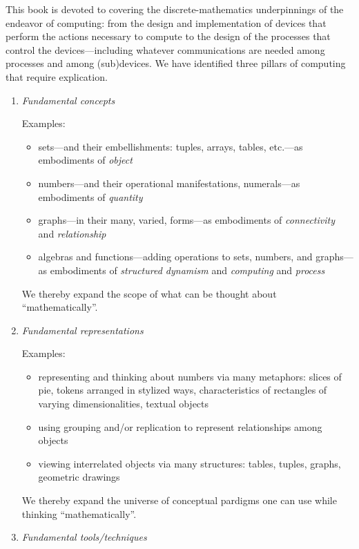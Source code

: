 This book is devoted to covering the discrete-mathematics
underpinnings of the endeavor of computing: from the design and
implementation of devices that perform the actions necessary to
compute to the design of the processes that control the
devices---including whatever communications are needed among processes
and among (sub)devices.  We have identified three pillars of computing
that require explication.
\begin{enumerate}
\item
{\it Fundamental concepts}

\medskip

{\small\sf Examples:}
\begin{itemize}
\item%
sets---and their embellishments: tuples, arrays, tables, etc.---as
embodiments of {\it object}
\item
numbers---and their operational manifestations, numerals---as
embodiments of {\it quantity}
\item
graphs---in their many, varied, forms---as embodiments of {\it
  connectivity} and {\it relationship}
\item
algebras and functions---adding operations to sets, numbers, and
graphs---as embodiments of {\it structured dynamism} and {\it
  computing} and {\it process}
\end{itemize}
We thereby expand the scope of what can be thought about
``mathematically''.

\item
{\it Fundamental representations}

\medskip

{\small\sf Examples:}
\begin{itemize}
\item
representing and thinking about numbers via many metaphors: slices of
pie, tokens arranged in stylized ways, characteristics of rectangles
of varying dimensionalities, textual objects
\item
using grouping and/or replication to represent relationships among
objects
\item
viewing interrelated objects via many structures: tables, tuples,
graphs, geometric drawings
\end{itemize}
We thereby expand the universe of conceptual pardigms one can use
while thinking ``mathematically''.

\item
{\it Fundamental tools/techniques}

\medskip


\end{enumerate}
